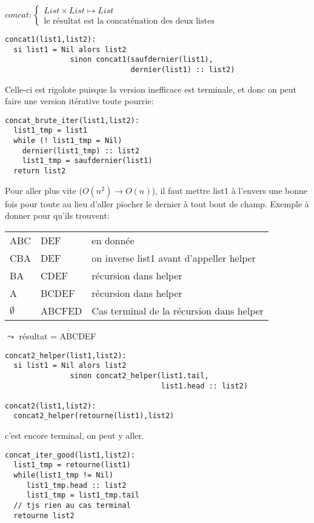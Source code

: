 \documentclass[10pt]{article}\usepackage[correction]{esial}
\begin{document}
\begin{Question}
  $concat: \left\{
    \begin{array}{l}
      List\times List\mapsto List\\
      \text{le résultat est la concaténation des deux listes}
    \end{array}\right.$  
\end{Question}
\begin{Reponse}
  \begin{Verbatim}[label=version brutale: $O(n^2)$]
concat1(list1,list2):
  si list1 = Nil alors list2
               sinon concat1(saufdernier(list1),
                             dernier(list1) :: list2)
  \end{Verbatim}

  Celle-ci est rigolote puisque la version inefficace est terminale, et donc on
  peut faire une version itérative toute pourrie: 

  \begin{Verbatim}[label=version brutale: $O(n^2)$]
concat_brute_iter(list1,list2):
  list1_tmp = list1
  while (! list1_tmp = Nil)
    dernier(list1_tmp) :: list2
    list1_tmp = saufdernier(list1)
  return list2
  \end{Verbatim}

  Pour aller plus vite ($O(n^2) \rightarrow O(n)$), il faut mettre list1 à
  l'envers une bonne fois pour toute au lieu d'aller piocher le dernier à tout
  bout de champ. Exemple à donner pour qu'ils trouvent:

  \begin{tabular}{|l l l|}\hline
    ABC&DEF& en donnée\\
    CBA&DEF& on inverse list1 avant d'appeller helper\\
    BA&CDEF& récursion dans helper\\
    A&BCDEF& récursion dans helper\\
    $\emptyset$&ABCFED& Cas terminal de la récursion dans helper\\\hline
  \end{tabular}$\leadsto$ résultat = ABCDEF

  \begin{Verbatim}[label=version récursive avec helper: $O(n)$]
concat2_helper(list1,list2): 
  si list1 = Nil alors list2
               sinon concat2_helper(list1.tail,
                                    list1.head :: list2)

concat2(list1,list2):
  concat2_helper(retourne(list1),list2)    
  \end{Verbatim}

  c'est encore terminal, on peut y aller.
  \begin{Verbatim}[label=version itérative efficace: $O(n)$]
concat_iter_good(list1,list2):
  list1_tmp = retourne(list1)
  while(list1_tmp != Nil)
     list1_tmp.head :: list2
     list1_tmp = list1_tmp.tail
  // tjs rien au cas terminal
  retourne list2
  \end{Verbatim}
\end{Reponse}
\end{document}
